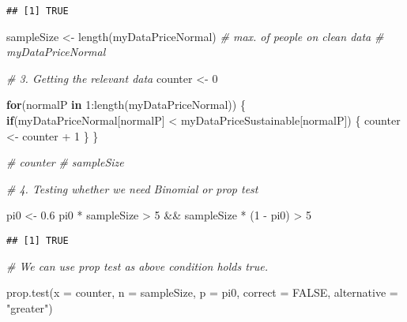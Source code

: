 \documentclass[
]{article}
\newenvironment{Shaded}{\begin{snugshade}}{\end{snugshade}}
\newcommand{\AttributeTok}[1]{\textcolor[rgb]{0.77,0.63,0.00}{#1}}
\newcommand{\CommentTok}[1]{\textcolor[rgb]{0.56,0.35,0.01}{\textit{#1}}}
\newcommand{\ConstantTok}[1]{\textcolor[rgb]{0.00,0.00,0.00}{#1}}
\newcommand{\ControlFlowTok}[1]{\textcolor[rgb]{0.13,0.29,0.53}{\textbf{#1}}}
\newcommand{\DecValTok}[1]{\textcolor[rgb]{0.00,0.00,0.81}{#1}}
\newcommand{\FloatTok}[1]{\textcolor[rgb]{0.00,0.00,0.81}{#1}}
\newcommand{\FunctionTok}[1]{\textcolor[rgb]{0.00,0.00,0.00}{#1}}
\newcommand{\NormalTok}[1]{#1}
\newcommand{\OtherTok}[1]{\textcolor[rgb]{0.56,0.35,0.01}{#1}}
\newcommand{\SpecialCharTok}[1]{\textcolor[rgb]{0.00,0.00,0.00}{#1}}
\newcommand{\StringTok}[1]{\textcolor[rgb]{0.31,0.60,0.02}{#1}}
\begin{document}
\begin{verbatim}
## [1] TRUE
\end{verbatim}

\begin{Shaded}
\begin{Highlighting}[]
\NormalTok{sampleSize }\OtherTok{\textless{}{-}} \FunctionTok{length}\NormalTok{(myDataPriceNormal) }\CommentTok{\# max. of people on clean data}
\CommentTok{\# myDataPriceNormal}

\CommentTok{\# 3. Getting the relevant data}
\NormalTok{counter }\OtherTok{\textless{}{-}} \DecValTok{0}

\ControlFlowTok{for}\NormalTok{(normalP }\ControlFlowTok{in} \DecValTok{1}\SpecialCharTok{:}\FunctionTok{length}\NormalTok{(myDataPriceNormal)) \{}
  \ControlFlowTok{if}\NormalTok{(myDataPriceNormal[normalP] }\SpecialCharTok{\textless{}}\NormalTok{ myDataPriceSustainable[normalP]) \{}
\NormalTok{    counter }\OtherTok{\textless{}{-}}\NormalTok{ counter }\SpecialCharTok{+} \DecValTok{1}
\NormalTok{  \}}
\NormalTok{\}}

\CommentTok{\# counter}
\CommentTok{\# sampleSize}

\CommentTok{\# 4. Testing whether we need Binomial or prop test}

\NormalTok{pi0 }\OtherTok{\textless{}{-}} \FloatTok{0.6}
\NormalTok{pi0 }\SpecialCharTok{*}\NormalTok{ sampleSize }\SpecialCharTok{\textgreater{}} \DecValTok{5} \SpecialCharTok{\&\&}\NormalTok{ sampleSize }\SpecialCharTok{*}\NormalTok{ (}\DecValTok{1} \SpecialCharTok{{-}}\NormalTok{ pi0) }\SpecialCharTok{\textgreater{}} \DecValTok{5}
\end{Highlighting}
\end{Shaded}

\begin{verbatim}
## [1] TRUE
\end{verbatim}

\begin{Shaded}
\begin{Highlighting}[]
\CommentTok{\# We can use prop test as above condition holds true.}

\FunctionTok{prop.test}\NormalTok{(}\AttributeTok{x =}\NormalTok{ counter, }\AttributeTok{n =}\NormalTok{ sampleSize, }\AttributeTok{p =}\NormalTok{ pi0, }\AttributeTok{correct =} \ConstantTok{FALSE}\NormalTok{, }\AttributeTok{alternative =} \StringTok{"greater"}\NormalTok{)}
\end{Highlighting}
\end{Shaded}
\end{document}
